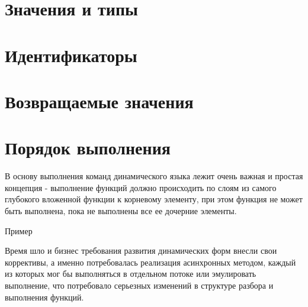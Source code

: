 \documentclass[../index.tex]{subfiles}
\begin{document}
\section{Значения и типы}

\section{Идентификаторы}

\section{Возвращаемые значения}

\section{Порядок выполнения}\label{sec:execrules} 
В основу выполнения команд динамического языка лежит очень важная и простая концепция - выполнение функций должно происходить по слоям из самого глубокого вложенной функции к корневому элементу, при этом функция не может быть выполнена, пока не выполнены все ее дочерние элементы.

Пример

Время шло и бизнес требования развития динамических форм внесли свои коррективы, а именно потребовалась реализация асинхронных методом, каждый из которых мог бы выполняться в отдельном потоке или эмулировать выполнение, что потребовало серьезных изменений в структуре разбора и выполнения функций.
\end{document}
